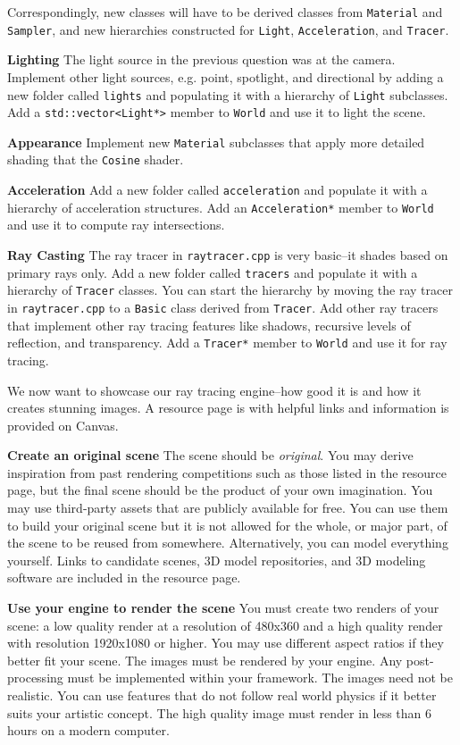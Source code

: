 \documentclass[addpoints]{exam}
\begin{document}
\begin{questions}
Correspondingly, new classes will have to be derived classes from \texttt{Material} and \texttt{Sampler}, and new hierarchies constructed for \texttt{Light}, \texttt{Acceleration}, and \texttt{Tracer}.

\textbf {Lighting} The light source in the previous question was at the camera. Implement other light sources, e.g. point, spotlight, and directional by adding a new folder called \texttt{lights} and populating it with a hierarchy of \texttt{Light} subclasses. Add a \texttt{std::vector<Light*>} member to \texttt{World} and use it to light the scene.

\textbf {Appearance} Implement new \texttt{Material} subclasses that apply more detailed shading that the \texttt{Cosine} shader.

  \textbf{Acceleration} Add a new folder called \texttt{acceleration} and populate it with a hierarchy of acceleration structures. Add an \texttt{Acceleration*} member to \texttt{World} and use it to compute ray intersections.

  \textbf{Ray Casting} The ray tracer in \texttt{raytracer.cpp} is very basic--it shades based on primary rays only. Add a new folder called \texttt{tracers} and populate it with a hierarchy of \texttt{Tracer} classes. You can start the hierarchy by moving the ray tracer in \texttt{raytracer.cpp} to a \texttt{Basic} class derived from \texttt{Tracer}. Add other ray tracers that implement other ray tracing features like shadows, recursive levels of reflection, and transparency. Add a \texttt{Tracer*} member to \texttt{World} and use it for ray tracing.

  We now want to showcase our ray tracing engine--how good it is and how it creates stunning images. A resource page is with helpful links and information is provided on Canvas.

  \textbf{Create an original scene} The scene should be \emph{original}. You may derive inspiration from past rendering competitions such as those listed in the resource page, but the final scene should be the product of your own imagination. You may use third-party assets that are publicly available for free. You can use them to build your original scene but it is not allowed for the whole, or major part, of the scene to be reused from somewhere. Alternatively, you can model everything yourself. Links to candidate scenes, 3D model repositories, and 3D modeling software are included in the resource page.

  \textbf{Use your engine to render the scene} You must create two renders of your scene: a low quality render at a resolution of 480x360 and a high quality render with resolution 1920x1080 or higher. You may use different aspect ratios if they better fit your scene. The images must be rendered by your engine. Any post-processing must be implemented within your framework. The images need not be realistic. You can use features that do not follow real world physics if it better suits your artistic concept. The high quality image must render in less than 6 hours on a modern computer.


\end{questions}
\end{document}
